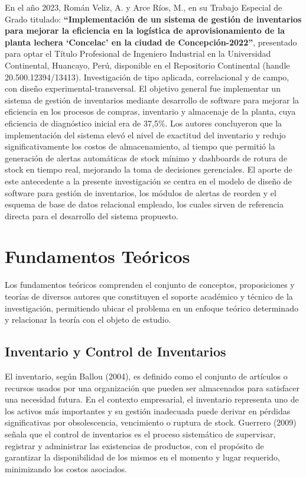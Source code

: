 \documentclass[12pt, letterpaper]{report}
\begin{document}
En el año 2023, Román Veliz, A. y Arce Ríos, M., en su Trabajo Especial
de Grado titulado: \textbf{``Implementación de un sistema de gestión de
inventarios para mejorar la eficiencia en la logística de
aprovisionamiento de la planta lechera `Concelac' en la ciudad de
Concepción-2022''}, presentado para optar el Título Profesional de
Ingeniero Industrial en la Universidad Continental, Huancayo, Perú,
disponible en el Repositorio Continental (handle 20.500.12394/13413).
Investigación de tipo aplicada, correlacional y de campo, con diseño
experimental-transversal. El objetivo general fue implementar un sistema
de gestión de inventarios mediante desarrollo de software para mejorar
la eficiencia en los procesos de compras, inventario y almacenaje de la
planta, cuya eficiencia de diagnóstico inicial era de 37,5\%. Los
autores concluyeron que la implementación del sistema elevó el nivel de
exactitud del inventario y redujo significativamente los costos de
almacenamiento, al tiempo que permitió la generación de alertas
automáticas de stock mínimo y dashboards de rotura de stock en tiempo
real, mejorando la toma de decisiones gerenciales. El aporte de este
antecedente a la presente investigación se centra en el modelo de diseño
de software para gestión de inventarios, los módulos de alertas de
reorden y el esquema de base de datos relacional empleado, los cuales
sirven de referencia directa para el desarrollo del sistema propuesto.

\section{Fundamentos Teóricos}

Los fundamentos teóricos comprenden el conjunto de conceptos,
proposiciones y teorías de diversos autores que constituyen el soporte
académico y técnico de la investigación, permitiendo ubicar el problema
en un enfoque teórico determinado y relacionar la teoría con el objeto
de estudio.

\subsection{Inventario y Control de Inventarios}

El inventario, según Ballou (2004), es definido como el conjunto de
artículos o recursos usados por una organización que pueden ser
almacenados para satisfacer una necesidad futura. En el contexto
empresarial, el inventario representa uno de los activos más
importantes y su gestión inadecuada puede derivar en pérdidas
significativas por obsolescencia, vencimiento o ruptura de stock.
Guerrero (2009) señala que el control de inventarios es el proceso
sistemático de supervisar, registrar y administrar las existencias de
productos, con el propósito de garantizar la disponibilidad de los
mismos en el momento y lugar requerido, minimizando los costos
asociados.
\end{document}
